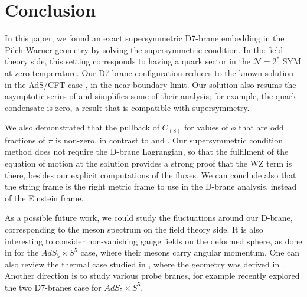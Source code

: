 \section{Conclusion}

In this paper, we found an exact supersymmetric D7-brane embedding in the Pilch-Warner geometry by solving the supersymmetric condition. In the field theory side, this setting corresponds to having a quark sector in the $\mathcal{N}=2^*$ SYM at zero temperature. Our D7-brane configuration reduces to the known solution in the AdS/CFT case \cite{Karch:2005ms}, in the near-boundary limit. Our solution also resums the asymptotic series of \cite{Albash:2011nw} and simplifies some of their analysis; for example, the quark condensate is zero, a result that is compatible with supersymmetry. 

We also demonstrated that the pullback of $C_{(8)}$ for values of $\phi$ that are odd fractions of $\pi$ is non-zero, in contrast to \cite{Albash:2011nw} and \cite{Evans:2005ti}. Our supersymmetric condition method does not require the D-brane Lagrangian, so that the fulfilment of the equation of motion at the solution provides a strong proof that the WZ term is there, besides our explicit computations of the fluxes. We can conclude also that the string frame is the right metric frame to use in the D-brane analysis, instead of the Einstein frame. 

As a possible future work, we could study the fluctuations around our D-brane, corresponding to the meson spectrum on the field theory side. 
It is also interesting to consider non-vanishing gauge fields on the deformed sphere, as done in \cite{Kruczenski:2003be} for the $AdS_5 \times S^5$ case, where their mesons carry angular momentum. One can also review the thermal case studied in \cite{Albash:2011dq}, where the geometry was derived in \cite{Buchel:2003ah}. Another direction is to study various probe branes, for example \cite{Faedo:2019jlp} recently explored the two D7-branes case for $AdS_5 \times S^5$.


